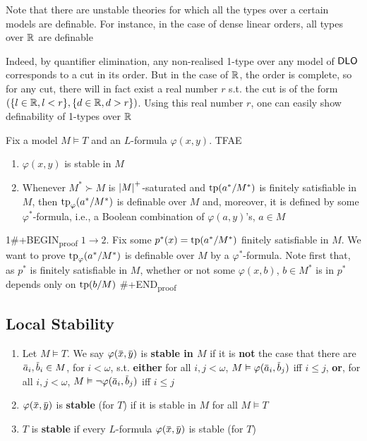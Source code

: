 \documentclass[11pt]{article}
\begin{document}
Note that there are unstable theories for which all the types over a certain models are
definable. For instance, in the case of dense linear orders, all types over \(\mathbb{R}\) are definable

Indeed, by quantifier elimination, any non-realised 1-type over any model of \(\operatorname{\textsf{DLO}}\)
corresponds to a cut in its order. But in the case of \(\mathbb{R}\), the order is complete, so for any
cut, there will in fact exist a real number \(r\) s.t. the cut is of the
form \((\{l\in\mathbb{R},l<r\},\{d\in\mathbb{R},d>r\})\). Using this real number \(r\), one can easily show definability
of 1-types over \(\mathbb{R}\)

\begin{proposition}[]
Fix a model \(M\vDash T\) and an \(L\)-formula \(\varphi(x,y)\). TFAE
\begin{enumerate}
\item \(\varphi(x,y)\) is stable in \(M\)
\item Whenever \(M^*\succ M\) is \(\abs{M}^+\)-saturated and \(\operatorname{tp}(a^*/M^*)\) is finitely satisfiable
in \(M\), then \(\operatorname{tp}_\varphi(a^*/M^*)\) is definable over \(M\) and, moreover, it is defined by
some \(\varphi^*\)-formula, i.e., a Boolean combination of \(\varphi(a,y)\)'s, \(a\in M\)
\end{enumerate}
\end{proposition}

1\#+BEGIN\textsubscript{proof}
\(1\to 2\). Fix some \(p^*(x)=\operatorname{tp}(a^*/M^*)\) finitely satisfiable in \(M\). We want to
prove \(\operatorname{tp}_\varphi(a^*/M^*)\) is definable over \(M\) by a \(\varphi^*\)-formula. Note first that,
as \(p^*\) is finitely satisfiable in \(M\), whether or not some \(\varphi(x,b)\), \(b\in M^*\) is
in \(p^*\) depends only on \(\operatorname{tp}(b/M)\)
\#+END\textsubscript{proof}

\subsection{Local Stability}
\label{sec:orgbf7c870}
\begin{definition}[]
\begin{enumerate}
\item Let \(M\vDash T\). We say \(\varphi(\barx,\bary)\) is \textbf{stable in \(M\)} if it is \textbf{not} the case that there
are \(\bara_i,\barb_i\in M\), for \(i<\omega\), s.t. \textbf{either} for all \(i,j<\omega\), \(M\vDash\varphi(\bara_i,\barb_j)\)
iff \(i\le j\), \textbf{or}, for all \(i,j<\omega\), \(M\vDash\neg\varphi(\bara_i,\barb_j)\) iff \(i\le j\)
\item \(\varphi(\barx,\bary)\) is \textbf{stable} (for \(T\)) if it is stable in \(M\) for all \(M\vDash T\)
\item \(T\) is \textbf{stable} if every \(L\)-formula \(\varphi(\barx,\bary)\) is stable (for \(T\))
\end{enumerate}
\end{definition}
\end{document}
